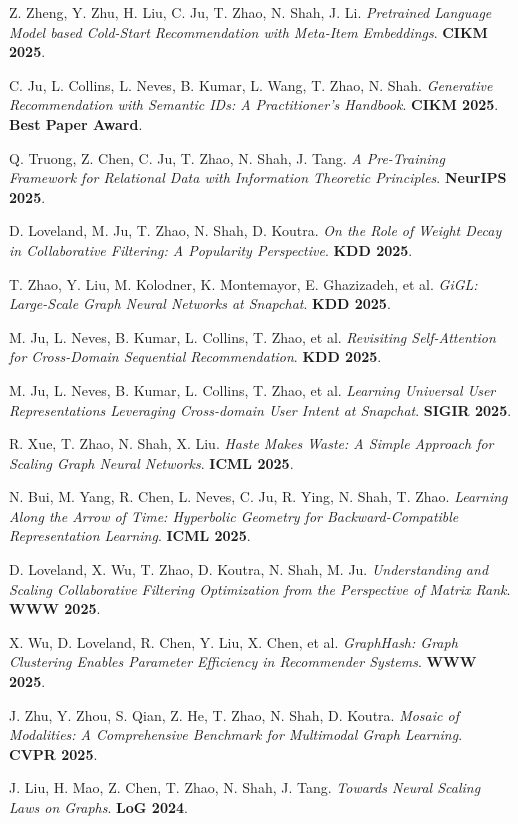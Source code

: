 \documentclass{article}
\begin{document}
\begin{etaremune}[itemsep=1pt,parsep=0pt]
\item Z. Zheng, Y. Zhu, H. Liu, C. Ju, T. Zhao, N. Shah, J. Li. \emph{Pretrained Language Model based Cold-Start Recommendation with Meta-Item Embeddings}. \textbf{CIKM 2025}.
\item C. Ju, L. Collins, L. Neves, B. Kumar, L. Wang, T. Zhao, N. Shah. \emph{Generative Recommendation with Semantic IDs: A Practitioner's Handbook}. \textbf{CIKM 2025}. \textbf{Best Paper Award}.
\item Q. Truong, Z. Chen, C. Ju, T. Zhao, N. Shah, J. Tang. \emph{A Pre-Training Framework for Relational Data with Information Theoretic Principles}. \textbf{NeurIPS 2025}.
\item D. Loveland, M. Ju, T. Zhao, N. Shah, D. Koutra. \emph{On the Role of Weight Decay in Collaborative Filtering: A Popularity Perspective}. \textbf{KDD 2025}.
\item T. Zhao, Y. Liu, M. Kolodner, K. Montemayor, E. Ghazizadeh, et al. \emph{GiGL: Large-Scale Graph Neural Networks at Snapchat}. \textbf{KDD 2025}.
\item M. Ju, L. Neves, B. Kumar, L. Collins, T. Zhao, et al. \emph{Revisiting Self-Attention for Cross-Domain Sequential Recommendation}. \textbf{KDD 2025}.
\item M. Ju, L. Neves, B. Kumar, L. Collins, T. Zhao, et al. \emph{Learning Universal User Representations Leveraging Cross-domain User Intent at Snapchat}. \textbf{SIGIR 2025}.
\item R. Xue, T. Zhao, N. Shah, X. Liu. \emph{Haste Makes Waste: A Simple Approach for Scaling Graph Neural Networks}. \textbf{ICML 2025}.
\item N. Bui, M. Yang, R. Chen, L. Neves, C. Ju, R. Ying, N. Shah, T. Zhao. \emph{Learning Along the Arrow of Time: Hyperbolic Geometry for Backward-Compatible Representation Learning}. \textbf{ICML 2025}.
\item D. Loveland, X. Wu, T. Zhao, D. Koutra, N. Shah, M. Ju. \emph{Understanding and Scaling Collaborative Filtering Optimization from the Perspective of Matrix Rank}. \textbf{WWW 2025}.
\item X. Wu, D. Loveland, R. Chen, Y. Liu, X. Chen, et al. \emph{GraphHash: Graph Clustering Enables Parameter Efficiency in Recommender Systems}. \textbf{WWW 2025}.
\item J. Zhu, Y. Zhou, S. Qian, Z. He, T. Zhao, N. Shah, D. Koutra. \emph{Mosaic of Modalities: A Comprehensive Benchmark for Multimodal Graph Learning}. \textbf{CVPR 2025}.
\item J. Liu, H. Mao, Z. Chen, T. Zhao, N. Shah, J. Tang. \emph{Towards Neural Scaling Laws on Graphs}. \textbf{LoG 2024}.

\end{etaremune}
\end{document}
